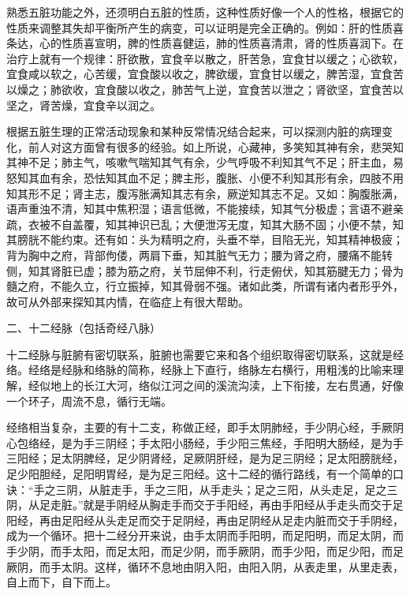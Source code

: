 \documentclass[a4paper,12pt,UTF8,twoside]{ctexbook}
\begin{document}
熟悉五脏功能之外，还须明白五脏的性质，这种性质好像一个人的性格，根据它的性质来调整其失却平衡所产生的病变，可以证明是完全正确的。例如：肝的性质喜条达，心的性质喜宣明，脾的性质喜健运，肺的性质喜清肃，肾的性质喜润下。在治疗上就有一个规律：肝欲散，宜食辛以散之，肝苦急，宜食甘以缓之；心欲软，宜食咸以软之，心苦缓，宜食酸以收之，脾欲缓，宜食甘以缓之，脾苦湿，宜食苦以燥之；肺欲收，宜食酸以收之，肺苦气上逆，宜食苦以泄之；肾欲坚，宜食苦以坚之，肾苦燥，宜食辛以润之。

根据五脏生理的正常活动现象和某种反常情况结合起来，可以探测内脏的病理变化，前人对这方面曾有很多的经验。如上所说，心藏神，多笑知其神有余，悲哭知其神不足；肺主气，咳嗽气喘知其气有余，少气呼吸不利知其气不足；肝主血，易怒知其血有余，恐怯知其血不足；脾主形，腹胀、小便不利知其形有余，四肢不用知其形不足；肾主志，腹泻胀满知其志有余，厥逆知其志不足。又如：胸腹胀满，语声重浊不清，知其中焦积湿；语言低微，不能接续，知其气分极虚；言语不避亲疏，衣被不自盖覆，知其神识已乱；大便泄泻无度，知其大肠不固；小便不禁，知其膀胱不能约束。还有如：头为精明之府，头垂不举，目陷无光，知其精神极疲；背为胸中之府，背部佝偻，两肩下垂，知其脏气无力；腰为肾之府，腰痛不能转侧，知其肾脏已虚；膝为筋之府，关节屈伸不利，行走俯伏，知其筋腱无力；骨为髓之府，不能久立，行立振掉，知其骨弱不强。诸如此类，所谓有诸内者形乎外，故可从外部来探知其内情，在临症上有很大帮助。

二、十二经脉（包括奇经八脉）

十二经脉与脏腑有密切联系，脏腑也需要它来和各个组织取得密切联系，这就是经络。经络是经脉和络脉的简称，经脉上下直行，络脉左右横行，用粗浅的比喻来理解，经似地上的长江大河，络似江河之间的溪流沟渎，上下衔接，左右贯通，好像一个环子，周流不息，循行无端。

经络相当复杂，主要的有十二支，称做正经，即手太阴肺经，手少阴心经，手厥阴心包络经，是为手三阴经；手太阳小肠经，手少阳三焦经，手阳明大肠经，是为手三阳经；足太阴脾经，足少阴肾经，足厥阴肝经，是为足三阴经；足太阳膀胱经，足少阳胆经，足阳明胃经，是为足三阳经。这十二经的循行路线，有一个简单的口诀：“手之三阴，从脏走手，手之三阳，从手走头；足之三阳，从头走足，足之三阴，从足走脏。”就是手阴经从胸走手而交于手阳经，再由手阳经从手走头而交于足阳经，再由足阳经从头走足而交于足阴经，再由足阴经从足走内脏而交于手阴经，成为一个循环。把十二经分开来说，由手太阴而手阳明，而足阳明，而足太阴，而手少阴，而手太阳，而足太阳，而足少阴，而手厥阴，而手少阳，而足少阳，而足厥阴，而手太阴。这样，循环不息地由阴入阳，由阳入阴，从表走里，从里走表，自上而下，自下而上。
\end{document}
